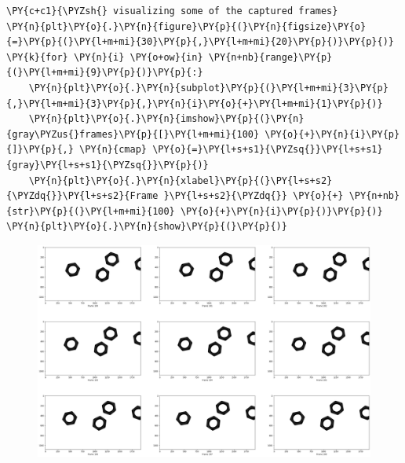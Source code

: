 \documentclass[a4paper,11pt]{article}%
\begin{document}
    \begin{tcolorbox}[breakable, size=fbox, boxrule=1pt, pad at break*=1mm,colback=cellbackground, colframe=cellborder]
\begin{Verbatim}[commandchars=\\\{\}]
\PY{c+c1}{\PYZsh{} visualizing some of the captured frames}
\PY{n}{plt}\PY{o}{.}\PY{n}{figure}\PY{p}{(}\PY{n}{figsize}\PY{o}{=}\PY{p}{(}\PY{l+m+mi}{30}\PY{p}{,}\PY{l+m+mi}{20}\PY{p}{)}\PY{p}{)}
\PY{k}{for} \PY{n}{i} \PY{o+ow}{in} \PY{n+nb}{range}\PY{p}{(}\PY{l+m+mi}{9}\PY{p}{)}\PY{p}{:}
    \PY{n}{plt}\PY{o}{.}\PY{n}{subplot}\PY{p}{(}\PY{l+m+mi}{3}\PY{p}{,}\PY{l+m+mi}{3}\PY{p}{,}\PY{n}{i}\PY{o}{+}\PY{l+m+mi}{1}\PY{p}{)}
    \PY{n}{plt}\PY{o}{.}\PY{n}{imshow}\PY{p}{(}\PY{n}{gray\PYZus{}frames}\PY{p}{[}\PY{l+m+mi}{100} \PY{o}{+}\PY{n}{i}\PY{p}{]}\PY{p}{,} \PY{n}{cmap} \PY{o}{=}\PY{l+s+s1}{\PYZsq{}}\PY{l+s+s1}{gray}\PY{l+s+s1}{\PYZsq{}}\PY{p}{)}
    \PY{n}{plt}\PY{o}{.}\PY{n}{xlabel}\PY{p}{(}\PY{l+s+s2}{\PYZdq{}}\PY{l+s+s2}{Frame }\PY{l+s+s2}{\PYZdq{}} \PY{o}{+} \PY{n+nb}{str}\PY{p}{(}\PY{l+m+mi}{100} \PY{o}{+}\PY{n}{i}\PY{p}{)}\PY{p}{)}
\PY{n}{plt}\PY{o}{.}\PY{n}{show}\PY{p}{(}\PY{p}{)}
\end{Verbatim}
\end{tcolorbox}

    \begin{figure}[!h]
		\centering
    \includegraphics[scale=0.3]{figures/output_35_0.png}
    \end{figure}
    { \hspace*{\fill} \\}
\end{document}
